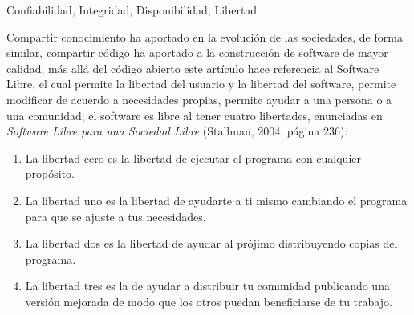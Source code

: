 \vspace{2mm}

\begin{multicols}{2}



 Confiabilidad, Integridad, Disponibilidad, Libertad

\vspace{1.0cm}

Compartir conocimiento ha aportado en la evolución de las sociedades, de forma similar, compartir código ha aportado a la construcción de software de mayor calidad; más allá del código abierto este artículo hace referencia al Software Libre, el cual permite la libertad del usuario y la libertad del software, permite modificar de acuerdo a necesidades propias, permite ayudar a una persona o a una comunidad; el software es libre al tener cuatro libertades, enunciadas en \textit{Software Libre para una Sociedad Libre} (Stallman, 2004, página 236): 

\vspace{0.1cm}

\begin{enumerate}
	\item[0.] La libertad cero es la libertad de ejecutar el programa con cualquier propósito. 
	\item[1.] La libertad uno es la libertad de ayudarte a ti mismo cambiando el programa para que se ajuste a tus necesidades. 
    \item[2.] La libertad dos es la libertad de ayudar al prójimo distribuyendo copias del programa. 
    \item[3.] La libertad tres es la de ayudar a distribuir tu comunidad publicando una versión mejorada de modo que los otros puedan beneficiarse de tu trabajo.
\end{enumerate}

\vspace{0.15cm}


\end{multicols}

